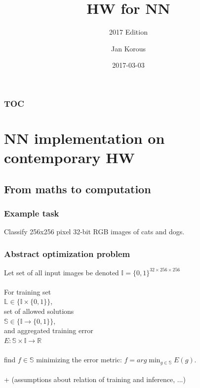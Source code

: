 \documentclass{beamer}
\title{HW for NN}
\subtitle{2017 Edition}
\author{Jan Korous}
\date{2017-03-03}
\begin{document}
	\maketitle
	
	\begin{frame}
		\frametitle{TOC}
		\tableofcontents
	\end{frame}

	\section{NN implementation on contemporary HW}

		\subsection{From maths to computation}
			\begin{frame}	
				\frametitle{Example task}
					Classify 256x256 pixel 32-bit RGB images of cats and dogs.
			\end{frame}		
			
			\begin{frame}
				\frametitle{Abstract optimization problem}
					Let set of all input images be denoted $\mathbb{I} = \{0, 1\}^{32 \times 256 \times 256}$\\~\\

					For training set\\
						$\mathbb{L} \in \{ \mathbb{I} \times \{0, 1\} \}$,\\
					set of allowed solutions\\
						$\mathbb{S} \in \{ \mathbb{I} \to \{0, 1\} \}$,\\
					and aggregated training error\\
						$E : \mathbb{S} \times \mathbb{I} \to \mathbb{R}$ \\~\\
					find $f \in \mathbb{S}$ minimizing the error metric: $f = arg\min_{g \in \mathbb{S}}{E(g)}$.\\~\\
					
					+ (assumptions about relation of training and inference, ...)
			\end{frame}
			
\end{document}
